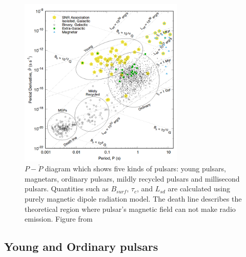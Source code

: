 \documentclass[thesis_msc.tex]{subfiles}
\begin{document}
        \begin{figure}[h] \centering \includegraphics[width=0.7\textwidth]{figures/P-pdot.png}
\caption{ $P- \dot{P}$ diagram which shows five kinds of pulsars: young pulsars, magnetars,  ordinary pulsars, mildly recycled pulsars and millisecond pulsars. Quantities such as $B_{surf}$, $\tau_c$, and $L_{sd}$ are calculated using purely magnetic dipole radiation model.  The death line describes the theoretical region where pulsar's magnetic field can not make radio emission. Figure from ~\cite{Alex}}
\label{ppdot}
\end{figure}

\subsection{Young and Ordinary pulsars}
\end{document}
